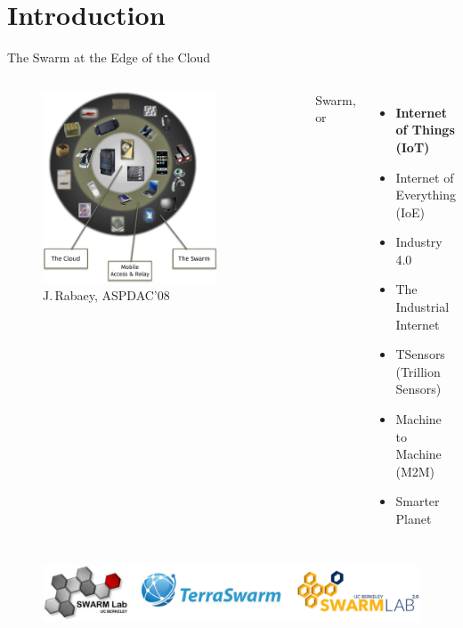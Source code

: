 \section{Introduction}

\begin{frame}{The Swarm at the Edge of the Cloud}
  \vspace{1em}
  \begin{columns}
    \begin{figure}
      \includegraphics[width=0.8\textwidth]{figures/swarm_jan.pdf}
      \caption{J.\,Rabaey, ASPDAC'08}
    \end{figure}

    \pause

    Swarm, or
    \begin{itemize}
    \item \textbf<3>{Internet of Things (IoT)}
    \item Internet of Everything (IoE)
    \item Industry 4.0
    \item The Industrial Internet
    \item TSensors (Trillion Sensors)
    \item Machine to Machine (M2M)
    \item Smarter Planet
    \end{itemize}

  \end{columns}
  \pause
  \begin{figure}
    \includegraphics[width=\textwidth]{figures/swarmlogo.pdf}
  \end{figure}
\end{frame}

